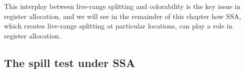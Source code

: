 {This interplay between live-range splitting and colorability is the key issue in register allocation, and we will see in the remainder of this chapter how SSA, which creates live-range splitting at particular locations, can play a role in register allocation.



\subsection{The spill test under SSA}
\label{sec:ra:spilltestssa}

}
